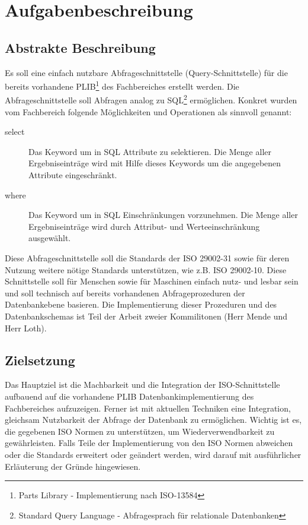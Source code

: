 \chapter{Aufgabenbeschreibung} \label{kap:aufgabenbeschreibung}

\section{Abstrakte Beschreibung}

Es soll eine einfach nutzbare Abfrageschnittstelle (Query-Schnittstelle) für die bereits vorhandene PLIB\footnote{Parts Library - Implementierung nach ISO-13584}  des Fachbereiches erstellt werden. Die Abfrageschnittstelle soll Abfragen analog zu SQL\footnote{Standard Query Language - Abfragesprach für relationale Datenbanken} ermöglichen. 
Konkret wurden vom Fachbereich folgende Möglichkeiten und Operationen als sinnvoll genannt:
\begin{description}
\item[select] Das Keyword um in SQL Attribute zu selektieren. Die Menge aller Ergebniseinträge wird mit Hilfe dieses Keywords um die angegebenen Attribute eingeschränkt.  
\item[where] Das Keyword um in SQL Einschränkungen vorzunehmen. Die Menge aller Ergebniseinträge wird durch Attribut- und Werteeinschränkung ausgewählt.  
\end{description}
 
Diese Abfrageschnittstelle soll die Standards der ISO 29002-31 sowie für deren Nutzung weitere nötige Standards unterstützen, wie z.B. ISO 29002-10. Diese Schnittstelle soll für Menschen sowie für Maschinen einfach nutz- und lesbar sein und soll technisch auf bereits vorhandenen Abfrageprozeduren der Datenbankebene basieren. Die Implementierung dieser Prozeduren und des Datenbankschemas ist Teil der Arbeit zweier Kommilitonen (Herr Mende und Herr Loth).

\section{Zielsetzung}

Das Hauptziel ist die Machbarkeit und die Integration der ISO-Schnittstelle aufbauend auf die vorhandene PLIB Datenbankimplementierung des Fachbereiches aufzuzeigen. 
Ferner ist mit aktuellen Techniken eine Integration, gleichsam Nutzbarkeit der Abfrage der Datenbank zu ermöglichen. Wichtig ist es, die gegebenen ISO Normen zu unterstützen, um Wiederverwendbarkeit zu gewährleisten. Falls Teile der Implementierung von den ISO Normen abweichen oder die Standards erweitert oder geändert werden, wird darauf mit ausführlicher Erläuterung der Gründe hingewiesen. 

